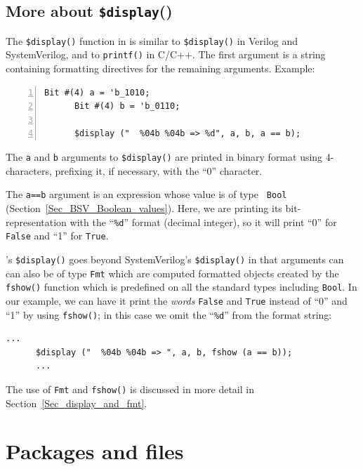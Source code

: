 
\subsection{More about {\tt \$display}()}

\label{BSV_display}

The \verb|$display()| function in {\BSV} is similar to
\verb|$display()| in Verilog and SystemVerilog, and to \verb|printf()|
in C/C++. The first argument is a string containing formatting
directives for the remaining arguments. Example:

{\small
\begin{Verbatim}[frame=single, numbers=left]
      Bit #(4) a = 'b_1010;
      Bit #(4) b = 'b_0110;

      $display ("  %04b %04b => %d", a, b, a == b);
\end{Verbatim}
}

The {\tt a} and {\tt b} arguments to \verb|$display()| are printed in
binary format using 4-characters, prefixing it, if necessary, with the
``0'' character.

The {\tt a==b} argument is an expression whose value is of type {\tt
Bool} (Section~\ref{Sec_BSV_Boolean_values}).  Here, we are printing
its bit-representation with the ``\verb|%d|'' format (decimal
integer), so it will print ``0'' for \verb|False| and ``1'' for
\verb|True|.

{\BSV}'s \verb|$display()| goes beyond SystemVerilog's
\verb|$display()| in that arguments can can also be of type \verb|Fmt|
which are computed formatted objects created by the \verb|fshow()|
function which is predefined on all the standard types including
\verb|Bool|.  In our example, we can have it print the \emph{words}
\verb|False| and \verb|True| instead of ``0'' and ``1'' by using
\verb|fshow()|; in this case we omit the ``\verb|%d|'' from the format
string:

{\small
\begin{Verbatim}[frame=single]
      ...
      $display ("  %04b %04b => ", a, b, fshow (a == b));
      ...
\end{Verbatim}
}

The use of \verb|Fmt| and \verb|fshow()| is discussed in more detail
in Section~\ref{Sec_display_and_fmt}.


\section{Packages and files}

